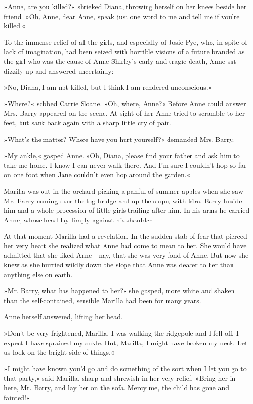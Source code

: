 »Anne, are you killed?« shrieked Diana, throwing herself on her knees beside her friend. »Oh, Anne, dear Anne, speak just one word to me and tell me if you're killed.«

To the immense relief of all the girls, and especially of Josie Pye, who, in spite of lack of imagination, had been seized with horrible visions of a future branded as the girl who was the cause of Anne Shirley's early and tragic death, Anne sat dizzily up and answered uncertainly:

»No, Diana, I am not killed, but I think I am rendered unconscious.«

»Where?« sobbed Carrie Sloane. »Oh, where, Anne?« Before Anne could answer Mrs. Barry appeared on the scene. At sight of her Anne tried to scramble to her feet, but sank back again with a sharp little cry of pain.

»What's the matter? Where have you hurt yourself?« demanded Mrs. Barry.

»My ankle,« gasped Anne. »Oh, Diana, please find your father and ask him to take me home. I know I can never walk there. And I'm sure I couldn't hop so far on one foot when Jane couldn't even hop around the garden.«

Marilla was out in the orchard picking a panful of summer apples when she saw Mr. Barry coming over the log bridge and up the slope, with Mrs. Barry beside him and a whole procession of little girls trailing after him. In his arms he carried Anne, whose head lay limply against his shoulder.

At that moment Marilla had a revelation. In the sudden stab of fear that pierced her very heart she realized what Anne had come to mean to her. She would have admitted that she liked Anne—nay, that she was very fond of Anne. But now she knew as she hurried wildly down the slope that Anne was dearer to her than anything else on earth.

»Mr. Barry, what has happened to her?« she gasped, more white and shaken than the self-contained, sensible Marilla had been for many years.

Anne herself answered, lifting her head.

»Don't be very frightened, Marilla. I was walking the ridgepole and I fell off. I expect I have sprained my ankle. But, Marilla, I might have broken my neck. Let us look on the bright side of things.«

»I might have known you'd go and do something of the sort when I let you go to that party,« said Marilla, sharp and shrewish in her very relief. »Bring her in here, Mr. Barry, and lay her on the sofa. Mercy me, the child has gone and fainted!«

